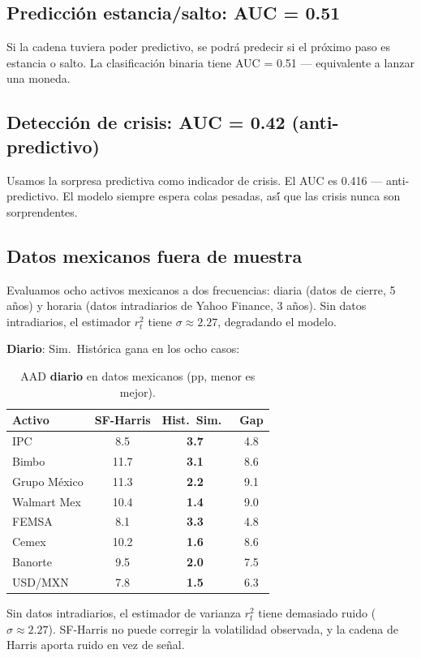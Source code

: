 \documentclass[12pt,letterpaper]{article}
\begin{document}
\subsection{Predicci\'{o}n estancia/salto: AUC = 0.51}

Si la cadena tuviera poder predictivo, se podr\'{a} predecir si el pr\'{o}ximo paso es estancia o salto. La clasificaci\'{o}n binaria tiene AUC = 0.51 --- equivalente a lanzar una moneda.

\subsection{Detecci\'{o}n de crisis: AUC = 0.42 (anti-predictivo)}

Usamos la sorpresa predictiva como indicador de crisis. El AUC es 0.416 --- anti-predictivo. El modelo siempre espera colas pesadas, as\'{\'i} que las crisis nunca son sorprendentes.

\subsection{Datos mexicanos fuera de muestra}

Evaluamos ocho activos mexicanos a dos frecuencias: diaria (datos de cierre, 5 a\~{n}os) y horaria (datos intradiarios de Yahoo Finance, 3 a\~{n}os). Sin datos intradiarios, el estimador $r_t^2$ tiene $\sigma \approx 2.27$, degradando el modelo.

\textbf{Diario}: Sim.\ Hist\'{o}rica gana en los ocho casos:

\begin{table}[h]
\centering
\caption{AAD \textbf{diario} en datos mexicanos (pp, menor es mejor).}
\label{tab:mexican-daily}
\begin{tabular}{lccc}
\toprule
Activo & SF-Harris & Hist.\ Sim.\ & Gap \\
\midrule
IPC & 8.5 & \textbf{3.7} & 4.8 \\
Bimbo & 11.7 & \textbf{3.1} & 8.6 \\
Grupo M\'{e}xico & 11.3 & \textbf{2.2} & 9.1 \\
Walmart Mex & 10.4 & \textbf{1.4} & 9.0 \\
FEMSA & 8.1 & \textbf{3.3} & 4.8 \\
Cemex & 10.2 & \textbf{1.6} & 8.6 \\
Banorte & 9.5 & \textbf{2.0} & 7.5 \\
USD/MXN & 7.8 & \textbf{1.5} & 6.3 \\
\bottomrule
\end{tabular}
\begin{flushleft}\small
Sin datos intradiarios, el estimador de varianza $r_t^2$ tiene demasiado ruido ($\sigma \approx 2.27$). SF-Harris no puede corregir la volatilidad observada, y la cadena de Harris aporta ruido en vez de se\~{n}al.
\end{flushleft}
\end{table}
\end{document}
